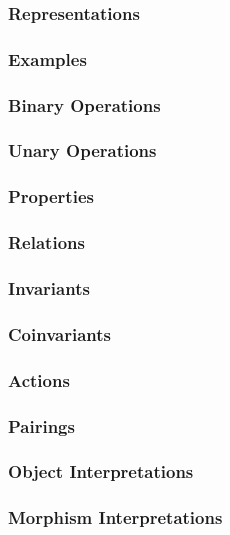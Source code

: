 \documentclass[a4paper]{amsart}
\begin{document}
\subsubsection*{Representations}

\subsubsection*{Examples}

\subsubsection*{Binary Operations}

\subsubsection*{Unary Operations}

\subsubsection*{Properties}

\subsubsection*{Relations}

\subsubsection*{Invariants}

\subsubsection*{Coinvariants}

\subsubsection*{Actions}

\subsubsection*{Pairings}

\subsubsection*{Object Interpretations}

\subsubsection*{Morphism Interpretations}

\end{document}
